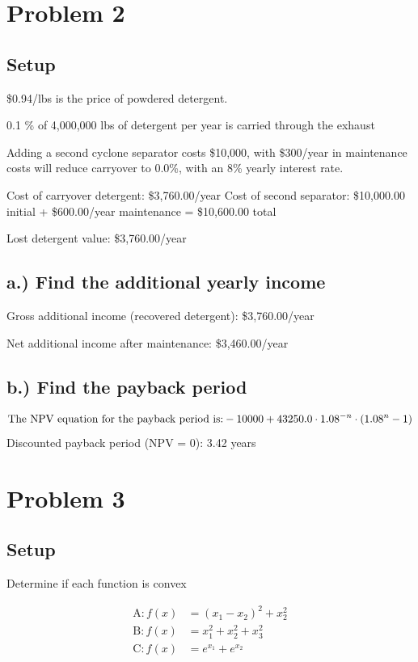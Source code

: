 \documentclass{article}%
\begin{document}
%
\section*{Problem 2}%
\label{sec:Problem2}%
\subsection*{Setup}%
\label{subsec:Setup}%
\$0.94/lbs is the price of powdered detergent.%
\par%
0.1 \% of 4,000,000 lbs of detergent per year is carried through the exhaust%
\par%
Adding a second cyclone separator costs \$10,000, with \$300/year in maintenance costs will reduce carryover to 0.0\%, with an 8\% yearly interest rate.%
\par%
Cost of carryover detergent: \$3,760.00/year\newline%
Cost of second separator: \$10,000.00 initial + \$600.00/year maintenance = \$10,600.00 total%
\par%
Lost detergent value: \$3,760.00/year%
\par

%
\subsection*{a.) Find the additional yearly income}%
\label{subsec:a.)Findtheadditionalyearlyincome}%
Gross additional income (recovered detergent): \$3,760.00/year%
\par%
Net additional income after maintenance: \$3,460.00/year%
\par

%
\subsection*{b.) Find the payback period}%
\label{subsec:b.)Findthepaybackperiod}%
\[%
\text{The NPV equation for the payback period is:\\} -10000 + 43250.0 \cdot {1.08}^{- n} \cdot \left({1.08}^{n} - 1\right)%
\]%
Discounted payback period (NPV = 0): 3.42 years%
\par

%
\section*{Problem 3}%
\label{sec:Problem3}%
\subsection*{Setup}%
\label{subsec:Setup}%
Determine if each function is convex%
\par%
\begin{align*}%
\text{A}: f(x) &= (x_1-x_2)^2 + x_2^2 \\%
\text{B}: f(x) &= x_1^2 + x_2^2+x_3^2 \\%
\text{C}: f(x) &= e^{x_1}+e^{x_2}%
\end{align*}
\end{document}
